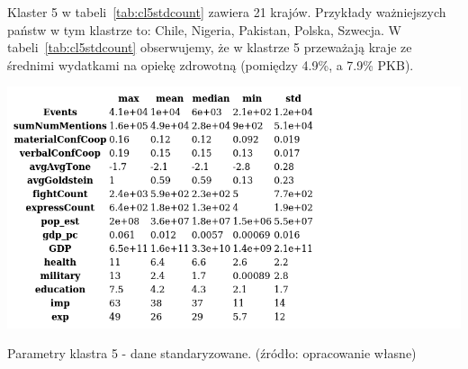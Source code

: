 \documentclass[11pt]{report}
\begin{document}
    Klaster 5 w tabeli~\ref{tab:cl5stdcount} zawiera 21 krajów.
    Przykłady ważniejszych państw w tym klastrze to: Chile, Nigeria, Pakistan, Polska, Szwecja.
    W tabeli~\ref{tab:cl5stdcount} obserwujemy, że w klastrze 5 przeważają kraje ze średnimi wydatkami na opiekę zdrowotną (pomiędzy 4.9\%, a 7.9\% PKB).

    \begin{table}[!htp]
        \centering
        \includegraphics[width=\linewidth]{tables/CLUST/desc/clust5std_desc.png}
        \caption{Parametry klastra 5 - dane standaryzowane. (źródło: opracowanie własne)}
        \label{tab:cl5std_desc}
    \end{table}
\end{document}
